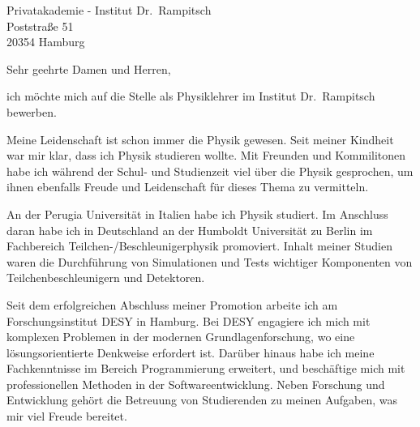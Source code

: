 \documentclass[ebner,paper=a4,fontsize=11pt,ngerman,BCOR=10mm]{scrlttr2}%
\begin{document}
\pagestyle{empty}

\begin{letter}{Privatakademie - Institut Dr.~Rampitsch\\
Poststra{\ss}e 51\\ 
20354 Hamburg}


\opening{Sehr geehrte Damen und Herren,} 

ich m{\"o}chte mich auf die Stelle als Physiklehrer im Institut
Dr.~Rampitsch bewerben.

Meine Leidenschaft ist schon immer die Physik
gewesen. Seit meiner Kindheit war mir klar, dass ich Physik studieren wollte.
Mit Freunden und Kommilitonen habe ich w{\"a}hrend der Schul- und Studienzeit
viel {\"u}ber die Physik gesprochen, um ihnen ebenfalls Freude und Leidenschaft
f{\"u}r dieses Thema zu vermitteln.


An der Perugia Universit{\"a}t in Italien habe ich Physik studiert. Im
Anschluss daran habe ich in Deutschland an der Humboldt Universit{\"a}t zu
Berlin im Fachbereich Teilchen-/Beschleunigerphysik promoviert. Inhalt meiner
Studien waren die Durchf{\"u}hrung von Simulationen und Tests wichtiger
Komponenten von Teilchenbeschleunigern und Detektoren.

Seit dem erfolgreichen Abschluss meiner Promotion arbeite ich am
Forschungsinstitut DESY in Hamburg. Bei DESY engagiere ich mich mit komplexen
Problemen in der modernen Grundlagenforschung, wo eine l{\"o}sungsorientierte
Denkweise erfordert ist. Dar{\"u}ber hinaus habe ich meine Fachkenntnisse im
Bereich Programmierung erweitert, und besch{\"a}ftige mich mit professionellen
Methoden in der Softwareentwicklung. Neben Forschung und Entwicklung geh{\"o}rt
die Betreuung von Studierenden zu meinen Aufgaben, was mir viel Freude bereitet.




\end{letter}
\end{document}
